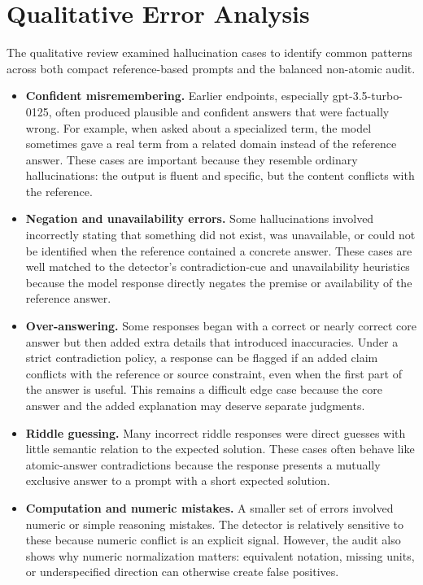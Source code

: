 \documentclass[11pt]{article}
\begin{document}
\section*{Qualitative Error Analysis}
The qualitative review examined hallucination cases to identify common patterns across both compact reference-based prompts and the balanced non-atomic audit.

\begin{itemize}[leftmargin=1.5em]
\item \textbf{Confident misremembering.} Earlier endpoints, especially gpt-3.5-turbo-0125, often produced plausible and confident answers that were factually wrong. For example, when asked about a specialized term, the model sometimes gave a real term from a related domain instead of the reference answer. These cases are important because they resemble ordinary hallucinations: the output is fluent and specific, but the content conflicts with the reference.

\item \textbf{Negation and unavailability errors.} Some hallucinations involved incorrectly stating that something did not exist, was unavailable, or could not be identified when the reference contained a concrete answer. These cases are well matched to the detector's contradiction-cue and unavailability heuristics because the model response directly negates the premise or availability of the reference answer.

\item \textbf{Over-answering.} Some responses began with a correct or nearly correct core answer but then added extra details that introduced inaccuracies. Under a strict contradiction policy, a response can be flagged if an added claim conflicts with the reference or source constraint, even when the first part of the answer is useful. This remains a difficult edge case because the core answer and the added explanation may deserve separate judgments.

\item \textbf{Riddle guessing.} Many incorrect riddle responses were direct guesses with little semantic relation to the expected solution. These cases often behave like atomic-answer contradictions because the response presents a mutually exclusive answer to a prompt with a short expected solution.

\item \textbf{Computation and numeric mistakes.} A smaller set of errors involved numeric or simple reasoning mistakes. The detector is relatively sensitive to these because numeric conflict is an explicit signal. However, the audit also shows why numeric normalization matters: equivalent notation, missing units, or underspecified direction can otherwise create false positives.


\end{itemize}
\end{document}
